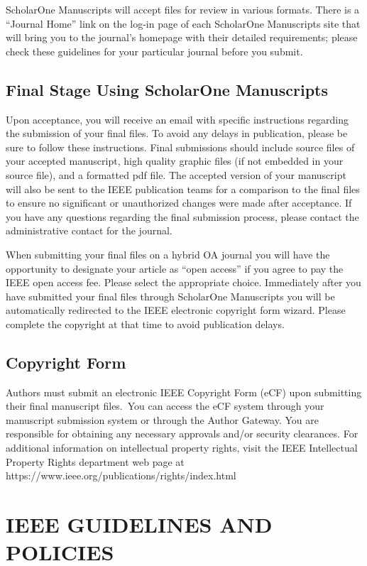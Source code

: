 \documentclass{IEEEtaes}
\begin{document}
ScholarOne Manuscripts will accept files for review in various formats. There is a ``Journal Home'' link on the log-in page of each ScholarOne Manuscripts site that will bring you to the journal's homepage with their detailed requirements; please check these guidelines for your particular journal before you submit.

\subsection{Final Stage Using ScholarOne Manuscripts}

Upon acceptance, you will receive an email with specific instructions regarding the submission of your final files. To avoid any delays in publication, please be sure to follow these instructions. Final submissions should include source files of your accepted manuscript, high quality graphic files (if not embedded in your source file), and a formatted pdf file. The accepted version of your manuscript will also be sent to the IEEE publication teams for a comparison to the final files to ensure no significant or unauthorized changes were made after acceptance. If you have any questions regarding the final submission process, please contact the administrative contact for the journal.

When submitting your final files on a hybrid OA journal you will have the opportunity to designate your article as ``open access'' if you agree to pay the IEEE open access fee. Please select the appropriate choice. Immediately after you have submitted your final files through ScholarOne Manuscripts you will be automatically redirected to the IEEE electronic copyright form wizard. Please complete the copyright at that time to avoid publication delays.

\subsection{Copyright Form}

Authors must submit an electronic IEEE Copyright Form (eCF) upon submitting their final manuscript files.~You can access the eCF system through your manuscript submission system or through the Author Gateway. You are responsible for obtaining any necessary approvals and/or security clearances. For additional information on intellectual property rights, visit the IEEE Intellectual Property Rights department web page at {{https://www.ieee.org/publications/rights/index.html}}

\section{IEEE GUIDELINES AND POLICIES}
\end{document}
